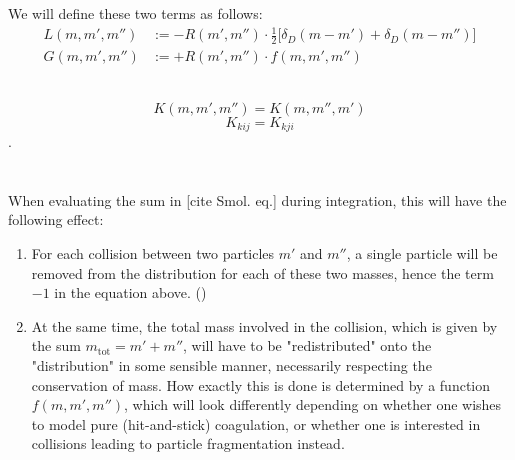         We will define these two terms as follows:
        \begin{align}
            L(m, m', m'') 
                &:= -R(m',m'') \cdot \frac{1}{2} \bigg[\delta_D(m-m')+\delta_D(m-m'')\bigg] \\
            G(m, m', m'') 
                &:= +R(m',m'') \cdot f(m, m', m'') 
        \end{align}

         \\
        \begin{equation}
            K(m,m',m'') = K(m,m'',m')
        \end{equation}
        \begin{equation}
            K_{kij} = K_{kji}
        \end{equation}
        . \\
         \\
         \\

        When evaluating the sum in [cite Smol. eq.] during integration, this will have the following 
        effect:
        \begin{enumerate}
            \item For each collision between two particles $m'$ and $m''$, a single particle will 
                be removed from the distribution for each of these two masses, hence the term $-1$ 
                in the equation above. ()
            \item At the same time, the total mass involved in the collision, which is given by the 
                sum $m_\text{tot} = m' + m''$, will have to be "redistributed" onto the "distribution" 
                in some sensible manner, necessarily respecting the conservation of mass. How exactly 
                this is done is determined by a function $f(m,m',m'')$, which will look differently 
                depending on whether one wishes to model pure (hit-and-stick) coagulation, or
                whether one is interested in collisions leading to particle fragmentation instead.
        \end{enumerate}

